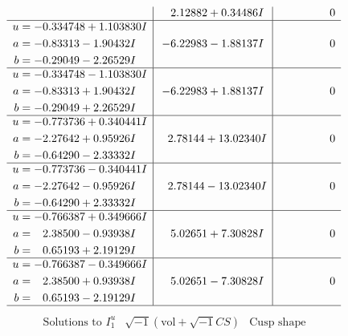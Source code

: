 \documentclass[1p]{elsarticle_modified}
\theoremstyle{definition}
\newcommand{\I}{\sqrt{-1}}
\begin{document}
$$\begin{array}{c|c|c}
 & \phantom{-}2.12882 + 0.34486 I & \phantom{-0.000000 } 0 \\ \hline\begin{aligned}
u &= -0.334748 + 1.103830 I \\
a &= -0.83313 - 1.90432 I \\
b &= -0.29049 - 2.26529 I\end{aligned}
 & -6.22983 - 1.88137 I & \phantom{-0.000000 } 0 \\ \hline\begin{aligned}
u &= -0.334748 - 1.103830 I \\
a &= -0.83313 + 1.90432 I \\
b &= -0.29049 + 2.26529 I\end{aligned}
 & -6.22983 + 1.88137 I & \phantom{-0.000000 } 0 \\ \hline\begin{aligned}
u &= -0.773736 + 0.340441 I \\
a &= -2.27642 + 0.95926 I \\
b &= -0.64290 - 2.33332 I\end{aligned}
 & \phantom{-}2.78144 + 13.02340 I & \phantom{-0.000000 } 0 \\ \hline\begin{aligned}
u &= -0.773736 - 0.340441 I \\
a &= -2.27642 - 0.95926 I \\
b &= -0.64290 + 2.33332 I\end{aligned}
 & \phantom{-}2.78144 - 13.02340 I & \phantom{-0.000000 } 0 \\ \hline\begin{aligned}
u &= -0.766387 + 0.349666 I \\
a &= \phantom{-}2.38500 - 0.93938 I \\
b &= \phantom{-}0.65193 + 2.19129 I\end{aligned}
 & \phantom{-}5.02651 + 7.30828 I & \phantom{-0.000000 } 0 \\ \hline\begin{aligned}
u &= -0.766387 - 0.349666 I \\
a &= \phantom{-}2.38500 + 0.93938 I \\
b &= \phantom{-}0.65193 - 2.19129 I\end{aligned}
 & \phantom{-}5.02651 - 7.30828 I & \phantom{-0.000000 } 0\\
 \hline 
 \end{array}$$\newpage$$\begin{array}{c|c|c}  
\text{Solutions to }I^u_{1}& \I (\text{vol} + \sqrt{-1}CS) & \text{Cusp shape}\\

\end{array}$$
\end{document}
